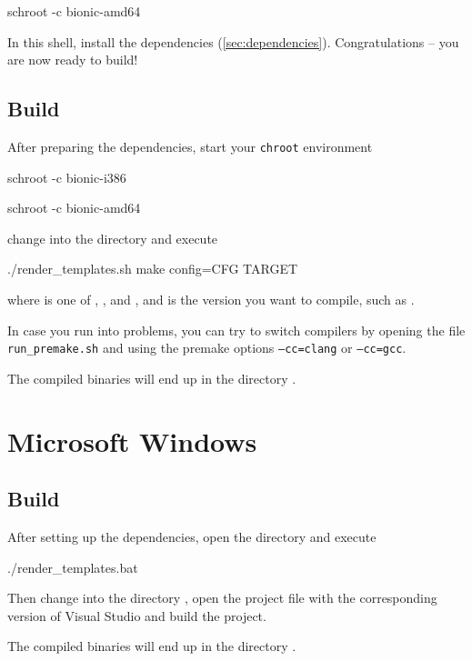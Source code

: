 \begin{Verbatim64}
  schroot -c bionic-amd64
\end{Verbatim64}

In this  shell, install the dependencies
(\ref{sec:dependencies}).  Congratulations -- you are now ready to
build!

\subsection{Build}

After preparing the dependencies, start your \texttt{chroot}
environment

\begin{Verbatim32}
  schroot -c bionic-i386
\end{Verbatim32}

\begin{Verbatim64}
  schroot -c bionic-amd64
\end{Verbatim64}

change into the directory  and execute

\begin{VerbatimBoth}
  ./render_templates.sh
  make config=CFG TARGET
\end{VerbatimBoth}

where  is one of ,
,  and
, and  is the version
you want to compile, such as .

In case you run into problems, you can try to switch compilers by
opening the file \texttt{run\_premake.sh} and using the premake
options \texttt{--cc=clang} or \texttt{--cc=gcc}.

The compiled binaries will end up in the directory .

\section{Microsoft Windows}

\subsection{Build}

After setting up the dependencies, open the directory 
and execute

\begin{VerbatimBoth}
  ./render_templates.bat
\end{VerbatimBoth}

Then change into the directory , open the
project file with the corresponding version of Visual Studio and build
the project.

The compiled binaries will end up in the directory .

